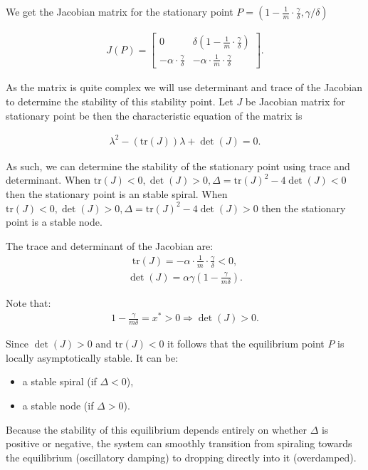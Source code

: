 \documentclass[reqno,10pt]{article}
\theoremstyle{definition}
\numberwithin{equation}{section}
\numberwithin{theorem}{section}
\begin{document}
We get the Jacobian matrix for the stationary point $P = ( 1- \frac{1}{m} \cdot \frac{\gamma}{\delta}, \gamma / \delta)$

\begin{align}
J(P) =
\begin{bmatrix}
0 & \delta \left(1 - \frac{1}{m} \cdot \frac{\gamma}{\delta} \right) \\
-\alpha \cdot \frac{\gamma}{\delta} & -\alpha \cdot \frac{1}{m} \cdot \frac{\gamma}{\delta}
\end{bmatrix}.
\end{align}

As the matrix is quite complex we will use determinant and trace of the Jacobian to determine the stability of this stability point. Let $J$ be Jacobian matrix for stationary point be then the characteristic equation of the matrix is

\begin{align}
\lambda^2 - (\text{tr}(J))\lambda + \det(J) = 0.
\end{align}

As such, we can determine the stability of the stationary point using trace and determinant. When
  $\text{tr}(J) < 0, \det(J) > 0, \Delta = \text{tr}(J)^2 - 4\det (J)< 0$ then the stationary point is an stable spiral. When 
  $\text{tr}(J) < 0, \det(J) > 0, \Delta = \text{tr}(J)^2 - 4\det (J)> 0$ then the stationary point is a stable node.


The trace and determinant of the Jacobian are:
\begin{align}
\text{tr}(J) = -\alpha \cdot \frac{1}{m} \cdot \frac{\gamma}{\delta} < 0,
\end{align}
\begin{align}
\det(J) = \alpha \gamma \left(1 - \frac{\gamma}{m \delta} \right).
\end{align}

Note that:
\begin{align}
1 - \frac{\gamma}{m \delta} = x^* > 0 \Rightarrow \det(J) > 0.
\end{align}

Since $\det(J) > 0$ and $\text{tr}(J) < 0$ it follows that the equilibrium point $P$ is locally asymptotically stable. It can be:
    \begin{itemize}
        \item a stable spiral (if $\Delta < 0$),
        \item a stable node (if $\Delta > 0$). 
    \end{itemize}
Because the stability of this equilibrium depends entirely on whether $\Delta$ is positive or negative, the system can smoothly transition from spiraling towards the equilibrium (oscillatory damping) to dropping directly into it (overdamped).
\end{document}
